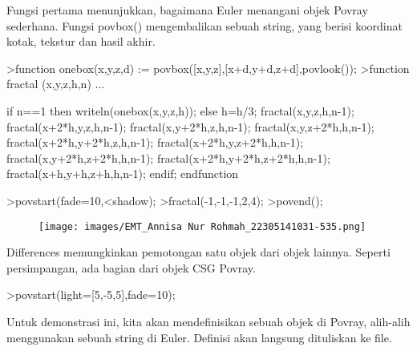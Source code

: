 \documentclass[a4paper,10pt]{article}
\begin{document}
\begin{eulernotebook}
\begin{eulercomment}
Fungsi pertama menunjukkan, bagaimana Euler menangani objek Povray
sederhana. Fungsi povbox() mengembalikan sebuah string, yang berisi
koordinat kotak, tekstur dan hasil akhir.
\end{eulercomment}
\begin{eulerprompt}
>function onebox(x,y,z,d) := povbox([x,y,z],[x+d,y+d,z+d],povlook());
>function fractal (x,y,z,h,n) ...
\end{eulerprompt}
\begin{eulerudf}
   if n==1 then writeln(onebox(x,y,z,h));
   else
     h=h/3;
     fractal(x,y,z,h,n-1);
     fractal(x+2*h,y,z,h,n-1);
     fractal(x,y+2*h,z,h,n-1);
     fractal(x,y,z+2*h,h,n-1);
     fractal(x+2*h,y+2*h,z,h,n-1);
     fractal(x+2*h,y,z+2*h,h,n-1);
     fractal(x,y+2*h,z+2*h,h,n-1);
     fractal(x+2*h,y+2*h,z+2*h,h,n-1);
     fractal(x+h,y+h,z+h,h,n-1);
   endif;
  endfunction
\end{eulerudf}
\begin{eulerprompt}
>povstart(fade=10,<shadow);
>fractal(-1,-1,-1,2,4);
>povend();
\end{eulerprompt}
\begin{figure}[h]
    \centering
    \texttt{[image: images/EMT\_Annisa Nur Rohmah\_22305141031-535.png]}
\end{figure}
\begin{eulercomment}
Differences memungkinkan pemotongan satu objek dari objek lainnya.
Seperti persimpangan, ada bagian dari objek CSG Povray.
\end{eulercomment}
\begin{eulerprompt}
>povstart(light=[5,-5,5],fade=10);
\end{eulerprompt}
\begin{eulercomment}
Untuk demonstrasi ini, kita akan mendefinisikan sebuah objek di
Povray, alih-alih menggunakan sebuah string di Euler. Definisi akan
langsung dituliskan ke file.


\end{eulercomment}
\end{eulernotebook}
\end{document}
